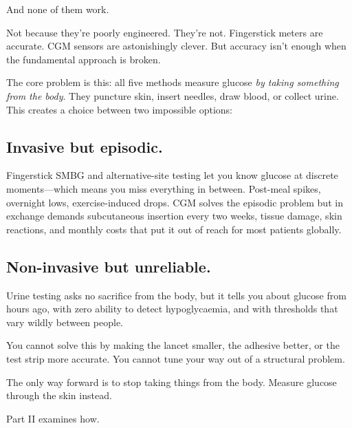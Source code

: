 And none of them work.

Not because they're poorly engineered. They're not. Fingerstick meters are  accurate. CGM sensors are astonishingly clever. But accuracy isn't enough when the fundamental approach is broken.

The core problem is this: all five methods measure glucose \textit{by taking something from the body}. They puncture skin, insert needles, draw blood, or collect urine. This creates a choice between two impossible options:

\subsection*{Invasive but episodic.}

Fingerstick SMBG and alternative-site testing let you know glucose at discrete moments---which means you miss everything in between. Post-meal spikes, overnight lows, exercise-induced drops. CGM solves the episodic problem but in exchange demands subcutaneous insertion every two weeks, tissue damage, skin reactions, and monthly costs that put it out of reach for most patients globally.

\subsection*{Non-invasive but unreliable.}

Urine testing asks no sacrifice from the body, but it tells you about glucose from hours ago, with zero ability to detect hypoglycaemia, and with thresholds that vary wildly between people.

You cannot solve this by making the lancet smaller, the adhesive better, or the test strip more accurate. You cannot tune your way out of a structural problem.

The only way forward is to stop taking things from the body. Measure glucose through the skin instead.

Part II examines how.

